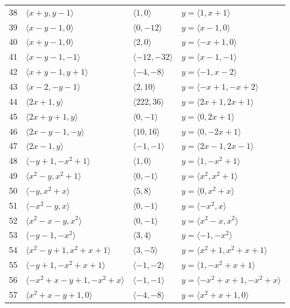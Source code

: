 \documentclass[11pt]{article}
\begin{document}
\begin{longtable}{@{}rlll@{}}
38 & $\langle x+y,y-1\rangle$ & $\langle 1,0\rangle$ & $y=\langle 1,x+1\rangle$\\
39 & $\langle x-y-1,0\rangle$ & $\langle 0,-12\rangle$ & $y=\langle x-1,0\rangle$\\
40 & $\langle x+y-1,0\rangle$ & $\langle 2,0\rangle$ & $y=\langle -x+1,0\rangle$\\
41 & $\langle x-y-1,-1\rangle$ & $\langle -12,-32\rangle$ & $y=\langle x-1,-1\rangle$\\
42 & $\langle x+y-1,y+1\rangle$ & $\langle -4,-8\rangle$ & $y=\langle -1,x-2\rangle$\\
43 & $\langle x-2,-y-1\rangle$ & $\langle 2,10\rangle$ & $y=\langle -x+1,-x+2\rangle$\\
44 & $\langle 2x+1,y\rangle$ & $\langle 222,36\rangle$ & $y=\langle 2x+1,2x+1\rangle$\\
45 & $\langle 2x+y+1,y\rangle$ & $\langle 0,-1\rangle$ & $y=\langle 0,2x+1\rangle$\\
46 & $\langle 2x-y-1,-y\rangle$ & $\langle 10,16\rangle$ & $y=\langle 0,-2x+1\rangle$\\
47 & $\langle 2x-1,y\rangle$ & $\langle -1,-1\rangle$ & $y=\langle 2x-1,2x-1\rangle$\\
48 & $\langle -y+1,-x^{2}+1\rangle$ & $\langle 1,0\rangle$ & $y=\langle 1,-x^{2}+1\rangle$\\
49 & $\langle x^{2}-y,x^{2}+1\rangle$ & $\langle 0,-1\rangle$ & $y=\langle x^{2},x^{2}+1\rangle$\\
50 & $\langle -y,x^{2}+x\rangle$ & $\langle 5,8\rangle$ & $y=\langle 0,x^{2}+x\rangle$\\
51 & $\langle -x^{2}-y,x\rangle$ & $\langle 0,-1\rangle$ & $y=\langle -x^{2},x\rangle$\\
52 & $\langle x^{2}-x-y,x^{2}\rangle$ & $\langle 0,-1\rangle$ & $y=\langle x^{2}-x,x^{2}\rangle$\\
53 & $\langle -y-1,-x^{2}\rangle$ & $\langle 3,4\rangle$ & $y=\langle -1,-x^{2}\rangle$\\
54 & $\langle x^{2}-y+1,x^{2}+x+1\rangle$ & $\langle 3,-5\rangle$ & $y=\langle x^{2}+1,x^{2}+x+1\rangle$\\
55 & $\langle -y+1,-x^{2}+x+1\rangle$ & $\langle -1,-2\rangle$ & $y=\langle 1,-x^{2}+x+1\rangle$\\
56 & $\langle -x^{2}+x-y+1,-x^{2}+x\rangle$ & $\langle -1,-1\rangle$ & $y=\langle -x^{2}+x+1,-x^{2}+x\rangle$\\
57 & $\langle x^{2}+x-y+1,0\rangle$ & $\langle -4,-8\rangle$ & $y=\langle x^{2}+x+1,0\rangle$\\

\end{longtable}
\end{document}
